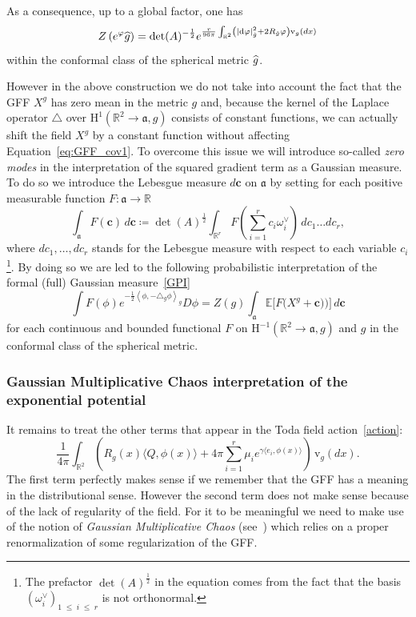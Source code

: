\documentclass[AHL,Unicode,longabstracts,published]{cedram}
\renewcommand{\leq}{\;\leqslant\;}
\newcommand{\dd}{\mathrm{d}}
\newcommand{\frka}{\mathfrak{a}}
\newcommand{\rmv}{\mathrm{v}}
\newcommand{\rmH}{\mathrm{H}}
\newcommand{\R}{\mathbb{R}}
\newcommand{\E}{\mathbb{E}}
\newcommand*\green[1]{#1}
\newcommand{\norm}[1]{\left\lvert#1\right\rvert}
\let\oldhat\hat
\renewcommand*{\hat}[1]{\mathchoice{\widehat{#1}}{\widehat{#1}}{\oldhat{#1}}{\oldhat{#1}}}
\begin{document}
As a consequence, up to a global factor, one has
\begin{equation}\label{reg_det}
Z\left(e^{\varphi}\hat g\right)=\det(A)^{-\frac12}e^{\frac{r}{96\pi}\int_{\R^2}\left(\norm{\dd \varphi}^2_{\hat g}+2R_{\hat g}\varphi\right)\rmv_{g}(dx)}
\end{equation}
within the conformal class of the spherical metric $\hat g$.

However in the above construction we do not take into account the fact that the GFF $X^g$ has zero mean in the metric $g$ and, because the kernel of the Laplace operator $\triangle$ over $\rmH^{1}(\R^2\to\frka,g)$ consists of constant functions, we can actually shift the field $X^g$ by a constant function without affecting Equation~\eqref{eq:GFF_cov1}. To overcome this issue we will introduce so-called\emph{ zero modes} in the interpretation of the squared gradient term as a Gaussian measure. To do so we introduce the Lebesgue measure $d\bm c$ on $\frka$ by setting for each positive measurable function $F:\frka\to\R$
\begin{equation}
\int_{\frka}F(\bm c)\,d\bm c\coloneqq \det(A)^{\frac12}\int_{\R^{r}}F\left(\sum_{i=1}^{r}c_i\omega_i^\vee\right)\,dc_1\dots dc_{r},
\end{equation}
where $dc_1,\dots, dc_{r}$ stands for the Lebesgue measure with respect to each variable $c_i$\footnote{The prefactor $\det(A)^{\frac12}$ in the equation comes from the fact that the basis $(\omega_i^\vee)_{1 \leq i \leq r}$ is not orthonormal.}. By doing so we are led to the following probabilistic interpretation of the formal (full) Gaussian measure~\eqref{GPI}
\begin{equation}\label{def:GPI}
\int F(\phi)e^{-\frac{1}{2}\left\langle \phi, -\triangle_{g} \phi \right\rangle_{g} }D\phi =Z(g) \int_{\frka}\E\Big[F\Big(X^g+\bm c)\Big)\Big]\,d\bm c
\end{equation}
for each continuous and bounded functional $F$ on $\rmH^{-1}(\R^2\to \frka,g)$ and $g$ in the conformal class of the spherical metric.

\subsubsection{Gaussian Multiplicative Chaos interpretation of the exponential potential}


It remains to treat the other terms that appear in the Toda field action~\eqref{action}:
\[
\frac{1}{4\pi} \int_{\R^2} \left(R_g(x) \langle Q, \green\phi(x) \rangle +4\pi \sum_{i=1}^{r} \mu_i e^{\gamma \langle e_i,\green\phi(x) \rangle} \right)\,\rmv_{g}(dx).
\]
The first term perfectly makes sense if we remember that the GFF has a meaning in the distributional sense. However the second term does not make sense because of the lack of regularity of the field. For it to be meaningful we need to make use of the notion of \emph{Gaussian Multiplicative Chaos} (see~\cite{Kah,review}) which relies on a proper renormalization of some regularization of the GFF.
\end{document}
